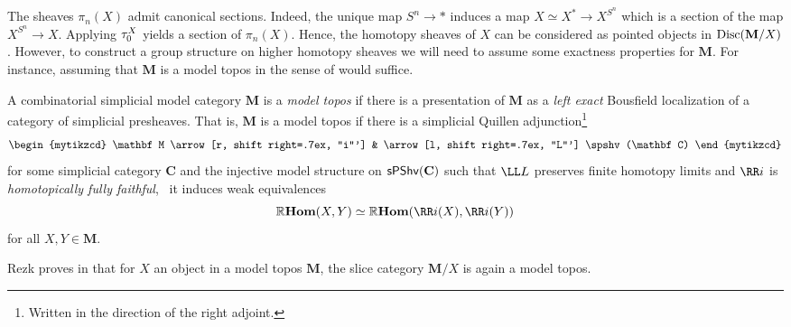 \documentclass[main.tex]{subfiles}
\begin{document}
The sheaves \(\pi_{n}(X)\) admit canonical sections. Indeed, the unique map
\(S^{n}\to *\) induces a map \(X\simeq X^{*}\to X^{S^{n}}\) which is a section
of the map \(X^{S^{n}}\to X\). Applying \(\tau_{0}^{X}\) yields a section of
\(\pi_{n}(X)\). Hence, the homotopy sheaves of \(X\) can be considered as
pointed objects in \(\operatorname{\textnormal{Disc}}(\mathbf M/X)\). However, to construct a group
structure on higher homotopy sheaves we will need to assume some exactness
properties for \(\mathbf M\). For instance, assuming that \(\mathbf M\) is a
model topos in the sense of \cite{rezkhomotopytoposes} would suffice.

\begin{definition}\label{defn:model-topos}
  A combinatorial simplicial model category \(\mathbf M\) is a \emph{model
    topos} if there is a presentation of \(\mathbf M\) as a \emph{left exact}
  Bousfield localization of a category of simplicial presheaves. That is,
  \(\mathbf M\) is a model topos if there is a simplicial Quillen
  adjunction\footnote{Written in the direction of the right adjoint.}
  \[
    \begin{mytikzcd}
      \mathbf M \arrow[r, shift right=.7ex, "i"'] & \arrow[l, shift right=.7ex,
      "L"'] \spshv(\mathbf C)
    \end{mytikzcd}
  \]
  for some simplicial category \(\mathbf C\) and the injective model structure
  on \(\operatorname{\textnormal{\textsf{sPShv}}}(\mathbf C)\) such that \(\LL L\) preserves finite homotopy limits
  and \(\RR i\) is \emph{homotopically fully faithful}, \ie~it induces weak
  equivalences
  \[
    \RHom(X, Y)\simeq\RHom(\RR i(X), \RR i(Y))
  \]
  for all \(X,Y\in\mathbf M\).
\end{definition}

Rezk proves in \cite[Corollary~6.10]{rezkhomotopytoposes} that for \(X\) an
object in a model topos \(\mathbf M\), the slice category \(\mathbf M/X\) is
again a model topos.


\end{document}

